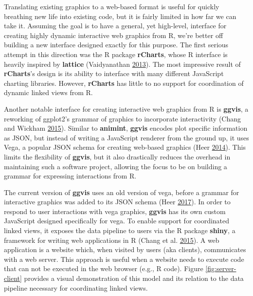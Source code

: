 \documentclass[12pt,]{isuthesis}
\begin{document}
Translating existing graphics to a web-based format is useful for
quickly breathing new life into existing code, but it is fairly limited
in how far we can take it. Assuming the goal is to have a general, yet
high-level, interface for creating highly dynamic interactive web
graphics from R, we're better off building a new interface designed
exactly for this purpose. The first serious attempt in this direction
was the R package \textbf{rCharts}, whose R interface is heavily
inspired by \textbf{lattice} (Vaidyanathan
\protect\hyperlink{ref-rCharts}{2013}). The most impressive result of
\textbf{rCharts}'s design is its ability to interface with many
different JavaScript charting libraries. However, \textbf{rCharts} has
little to no support for coordination of dynamic linked views from R.

Another notable interface for creating interactive web graphics from R
is \textbf{ggvis}, a reworking of ggplot2's grammar of graphics to
incorporate interactivity (Chang and Wickham
\protect\hyperlink{ref-ggvis}{2015}). Similar to \textbf{animint},
\textbf{ggvis} encodes plot specific information as JSON, but instead of
writing a JavaScript renderer from the ground up, it uses Vega, a
popular JSON schema for creating web-based graphics (Heer
\protect\hyperlink{ref-vega}{2014}). This limits the flexibility of
\textbf{ggvis}, but it also drastically reduces the overhead in
maintaining such a software project, allowing the focus to be on
building a grammar for expressing interactions from R.

The current version of \textbf{ggvis} uses an old version of vega,
before a grammar for interactive graphics was added to its JSON schema
(Heer \protect\hyperlink{ref-vega-lite}{2017}). In order to respond to
user interactions with vega graphics, \textbf{ggvis} has its own custom
JavaScript designed specifically for vega. To enable support for
coordinated linked views, it exposes the data pipeline to users via the
R package \textbf{shiny}, a framework for writing web applications in R
(Chang et al. \protect\hyperlink{ref-shiny}{2015}). A web application is
a website which, when visited by users (aka clients), communicates with
a web server. This approach is useful when a website needs to execute
code that can not be executed in the web browser (e.g., R code). Figure
\ref{fig:server-client} provides a visual demonstration of this model
and its relation to the data pipeline necessary for coordinating linked
views.
\end{document}
